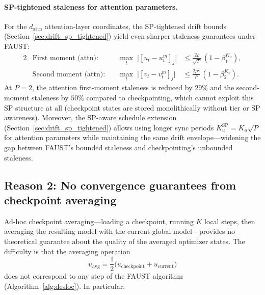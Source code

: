 \documentclass{article}
\begin{document}
\paragraph{SP-tightened staleness for attention parameters.}
For the $d_{\text{attn}}$ attention-layer coordinates, the SP-tightened
drift bounds (Section~\ref{sec:drift_sp_tightened}) yield even sharper
staleness guarantees under FAUST:
\begin{alignat}{2}
&\text{First moment (attn):}\quad&
\max_t\;\bigl|[u_t - u_t^m]_j\bigr|
&\leq \frac{2\rho}{\sqrt{P}}\,(1 - \beta_1^{K_u}),
\label{eq:ckpt_nsp_u_sp} \\[4pt]
&\text{Second moment (attn):}\quad&
\max_t\;\bigl|[v_t - v_t^m]_j\bigr|
&\leq \frac{2\rho^2}{P}\,(1 - \beta_2^{K_v}).
\label{eq:ckpt_nsp_v_sp}
\end{alignat}
At $P = 2$, the attention first-moment staleness is reduced by $29\%$
and the second-moment staleness by $50\%$ compared to checkpointing,
which cannot exploit this SP structure at all (checkpoint states are
stored monolithically without tier or SP awareness).
Moreover, the SP-aware schedule extension
(Section~\ref{sec:drift_sp_tightened}) allows using longer sync periods
$K_u^{\text{SP}} = K_u\sqrt{P}$ for attention parameters while maintaining
the same drift envelope---widening the gap between FAUST's bounded
staleness and checkpointing's unbounded staleness.

\subsection{Reason 2: No convergence guarantees from checkpoint averaging}
\label{sec:checkpoint_convergence}

Ad-hoc checkpoint averaging---loading a checkpoint, running $K$ local
steps, then averaging the resulting model with the current global
model---provides no theoretical guarantee about the quality of the
averaged optimizer states. The difficulty is that the averaging operation
\begin{equation}
u_{\text{avg}} = \frac{1}{2}\bigl(u_{\text{checkpoint}} + u_{\text{current}}\bigr)
\label{eq:ckpt_avg}
\end{equation}
does not correspond to any step of the FAUST algorithm
(Algorithm~\ref{alg:desloc}). In particular:
\end{document}
